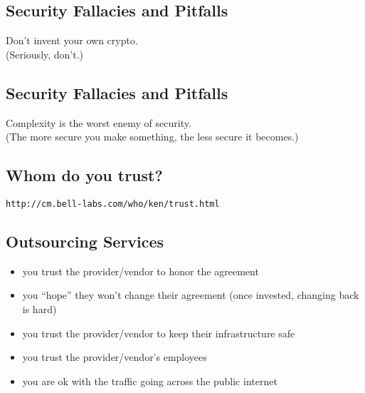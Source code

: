 \documentclass[xga]{xdvislides}
\begin{document}
\subsection{Security Fallacies and Pitfalls}
\vspace*{\fill}
\begin{center}
    \Hugesize
        Don't invent your own crypto. \\
	\vspace{.25in}
	\Normalsize
	(Seriously, don't.)
\end{center}
\vspace*{\fill}

\subsection{Security Fallacies and Pitfalls}
\vspace*{\fill}
\begin{center}
    \Hugesize
	Complexity is the worst enemy of security. \\
	\vspace{.25in}
	\Normalsize
	(The more secure you make something, the less secure it becomes.)
\end{center}
\vspace*{\fill}

\subsection{Whom do you trust?}
\vspace*{\fill}
\begin{center}
	\verb+http://cm.bell-labs.com/who/ken/trust.html+
\end{center}
\vspace*{\fill}
\Normalsize

\subsection{Outsourcing Services}
\begin{itemize}
	\item you trust the provider/vendor to honor the agreement
	\item you ``hope'' they won't change their agreement (once
		invested, changing back is hard)
	\item you trust the provider/vendor to keep their infrastructure
		safe
	\item you trust the provider/vendor's employees
	\item you are ok with the traffic going across the public internet
\end{itemize}
\end{document}
